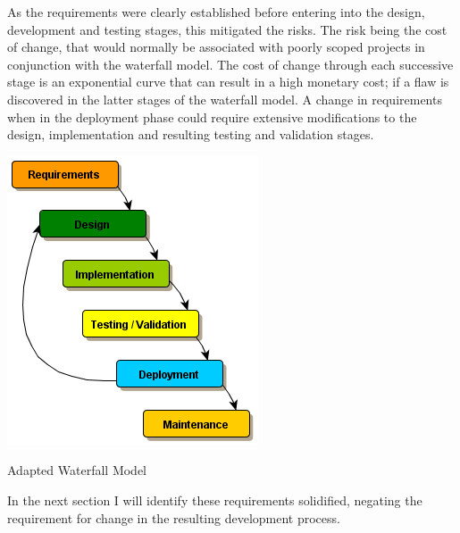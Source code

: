 {		\begin{multicols}{2}
		
			As the requirements were clearly established before entering into the design, development and testing stages, this mitigated the risks. 
			The risk being the cost of change, that would normally be associated with poorly scoped projects in conjunction with the waterfall model.		
			\newline
			\newline
			The cost of change through each successive stage is an exponential curve that can result in a high monetary cost; 
			if a flaw is discovered in the latter stages of the waterfall model.  A change in requirements when in the deployment
			phase could require extensive modifications to the design, implementation and resulting testing and validation stages.
			
			\vfill
			\columnbreak
		
			\begin{figurehere}
				\centering
				\includegraphics[scale=0.65]{pages/chapter3/figures/softwarecycle.png}
				\caption{Adapted Waterfall Model}
				\label{fig:AdaptedWaterfallModel}
			\end{figurehere}
			\vfill
			
		\end{multicols}	
		
		In the next section I will identify these requirements solidified, negating the requirement for change in the resulting development process. 
		\newline
	}
	